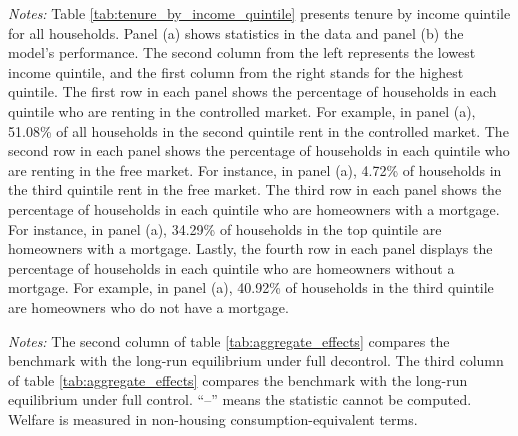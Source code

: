 \documentclass[parskip=full]{article}
\newenvironment{fignote2}[1]
{
\par
\medskip
\begin{minipage}{#1}
\footnotesize
}
{
\end{minipage}
}
\begin{document}
\begin{table}[H]
    \centering
    \caption{Tenure by income quintile for working-age households in benchmark}
    \vspace{-0.5cm}
    \label{tab:tenure_by_income_quintile}    
    \vspace{-0.45cm}
    \begin{fignote2}{0.66\textwidth}
      \textit{Notes:} Table \ref{tab:tenure_by_income_quintile} presents tenure by income quintile for all households. Panel (a) shows statistics in the data and panel (b) the model's performance. The second column from the left represents the lowest income quintile, and the first column from the right stands for the highest quintile. The first row in each panel shows the percentage of households in each quintile who are renting in the controlled market. For example, in panel (a), 51.08\% of all households in the second quintile rent in the controlled market. The second row in each panel shows the percentage of households in each quintile who are renting in the free market. For instance, in panel (a), 4.72\% of households in the third quintile rent in the free market. The third row in each panel shows the percentage of households in each quintile who are homeowners with a mortgage. For instance, in panel (a), 34.29\% of households in the top quintile are homeowners with a mortgage. Lastly, the fourth row in each panel displays the percentage of households in each quintile who are homeowners without a mortgage. For example, in panel (a), 40.92\% of households in the third quintile are homeowners who do not have a mortgage.
    \end{fignote2}
\end{table}

\begin{table}[H]
    \centering
    \caption{Aggregate effects}
    \vspace{-0.5cm}
    \label{tab:aggregate_effects}
    
    \vspace{-0.45cm}
    \begin{fignote2}{0.67\textwidth}
      \textit{Notes:} The second column of table \ref{tab:aggregate_effects} compares the benchmark with the long-run equilibrium under full decontrol. The third column of table \ref{tab:aggregate_effects} compares the benchmark with the long-run equilibrium under full control. “--” means the statistic cannot be computed. Welfare is measured in non-housing consumption-equivalent terms.
    \end{fignote2}
\end{table}
\end{document}
